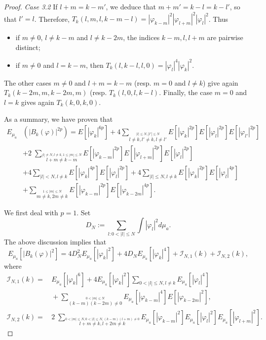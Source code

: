 \documentclass[11pt,leqno]{amsart}
\begin{document}
\begin{proof}
{\it Case 3.2} \;  If  $l+m=k-m'$, we deduce that $m+m'=k-l=k-l'$, so that  $l'=l$. Therefore, $T_k(l,m,l,k-m-l)=|\varphi_{k-m}|^2 |\varphi_{l+m}|^2 |\varphi_{l}|^2$. Thus
\begin{itemize}
\item if $m\neq 0$, $l\neq k-m$ and $l \neq k-2m$, the indices $k-m, l ,l+m$ are pairwise distinct; 
\item if $m\neq 0$ and $l=k-m$, then $T_k(l,k-l,l,0)=|\varphi_{l}|^4 |\varphi_{k}|^2 $.
\end{itemize} 
The other cases $m\neq 0$ and $l+m=k-m$ (resp. $m=0$ and $l\neq k$) give again $T_k(k-2m,m,k-2m,m)$ (resp. $T_k(l,0,l,k-l)$. 
Finally, the case $m=0$ and $l=k$ gives again $T_k(k,0,k,0)$. 
\smallskip

As a summary, we have proven that
\begin{align} \label{B_k^2p}
 E_{\mu_a}&  (| B_k(\varphi) |^{2p})= E[|\varphi_k|^{6p}] 
+ 4 \sum_{\stackrel{|l|\leq N, |l'|\leq N}{ l\neq k, l'\neq k, l\neq l'}}  E[ |\varphi_k|^{2p}] E[ |\varphi_l|^{2p}] E[ | \varphi_{l'}|^{2p}] \nonumber \\
&+ 2\;    \sum_{\stackrel{|l|\neq N, l\neq k,  1\leq |m|\leq N} { l+m\neq k-m}} E[ |\varphi_{k-m}|^{2p}] E[ |\varphi_{l+m} |^{2p}] E[ | \varphi_{l}|^{2p}] \nonumber  \\
&+4 \sum_{|l|< N, l\neq k} E[ |\varphi_k|^{4p}] E[ |\varphi_l|^{2p}] +4  \sum_{|l|\leq N, l\neq k}  E[ |\varphi_k|^{2p}] E[ |\varphi_l|^{4p}] \nonumber \\
&+ \sum_{\stackrel{1\leq |m| \leq N}{ m\neq k, 2m\neq k}}\!\! E[ |\varphi_{k-m}|^{2p}]E[ | \varphi_{k-2m}|^{4p}] .
\end{align} 

We first deal with $p=1$.  Set 
\[ D_N:=\sum_{l:0<|l|\leq N} \int |\varphi_l|^2 d\mu_a.\] 
The above discussion implies that 
\begin{equation}  \label{EB_k^2} 
E_{\mu_a} [ |B_k(\varphi)| ^2] = 4 D_N^2 E_{\mu_a}[|\varphi_k|^2] + 4 D_N E_{\mu_a} [|\varphi_k|^4] + {\mathcal I}_{N,1}(k) + {\mathcal I}_{N,2}(k), \end{equation}
where 
\begin{align*}
{\mathcal I}_{N,1}(k)  = &\,  E_{\mu_a}[|\varphi_k|^6] +  4 E_{\mu_a}[ |\varphi_k|^2]  \sum_{0<|l|\leq N, l\neq k} E_{\mu_a}[|\varphi_l|^4] \\
&\, + { \sum_{ \stackrel{0<|m|\leq N}{ (k-m)(k-2m)\neq 0 } } } \!\! E_{\mu_a} [|\varphi_{k-m}|^4 ] E[ |\varphi_{k-2m}|^2],\\
{\mathcal I}_{N,2}(k) =  
&\,  2  \;   { \sum_{\stackrel{0<|m|\leq N, 0<|l|\leq N, (k-m)(l+m)\neq 0}  {  l+m\neq k, l+2m\neq k}} } E_{\mu_a} [|\varphi_{k-m}|^2] E_{\mu_a} [|\varphi_{l}|^2] E_{\mu_a} [|\varphi_{l+m}|^2] . 
\end{align*}


\end{proof}
\end{document}
